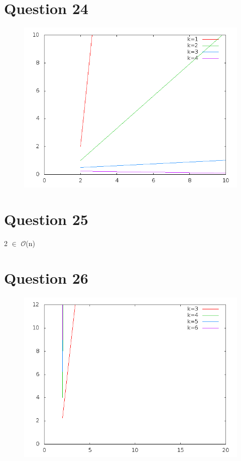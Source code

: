 \documentclass[a4paper,12pt]{report}
\begin{document}
\section*{Question 24}
\begin{figure}[!ht]
	\center
	\includegraphics[scale=0.4]{q24.png}
\end{figure}

\section*{Question 25}
2 $\in$ $\mathcal{O}$(n)

\newpage

\section*{Question 26}
\begin{figure}[!ht]
	\center
	\includegraphics[scale=0.4]{q26.png}
\end{figure}
\end{document}
